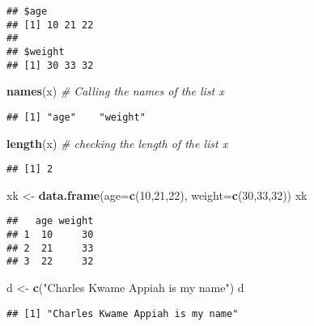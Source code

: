 \documentclass[
]{article}
\newenvironment{Shaded}{\begin{snugshade}}{\end{snugshade}}
\newcommand{\AttributeTok}[1]{\textcolor[rgb]{0.13,0.29,0.53}{#1}}
\newcommand{\CommentTok}[1]{\textcolor[rgb]{0.56,0.35,0.01}{\textit{#1}}}
\newcommand{\DecValTok}[1]{\textcolor[rgb]{0.00,0.00,0.81}{#1}}
\newcommand{\FunctionTok}[1]{\textcolor[rgb]{0.13,0.29,0.53}{\textbf{#1}}}
\newcommand{\NormalTok}[1]{#1}
\newcommand{\OtherTok}[1]{\textcolor[rgb]{0.56,0.35,0.01}{#1}}
\newcommand{\StringTok}[1]{\textcolor[rgb]{0.31,0.60,0.02}{#1}}
\begin{document}
\begin{verbatim}
## $age
## [1] 10 21 22
## 
## $weight
## [1] 30 33 32
\end{verbatim}

\begin{Shaded}
\begin{Highlighting}[]
\FunctionTok{names}\NormalTok{(x) }\CommentTok{\# Calling the names of the list x}
\end{Highlighting}
\end{Shaded}

\begin{verbatim}
## [1] "age"    "weight"
\end{verbatim}

\begin{Shaded}
\begin{Highlighting}[]
\FunctionTok{length}\NormalTok{(x) }\CommentTok{\# checking the length of the list x}
\end{Highlighting}
\end{Shaded}

\begin{verbatim}
## [1] 2
\end{verbatim}

\begin{Shaded}
\begin{Highlighting}[]
\NormalTok{xk }\OtherTok{\textless{}{-}} \FunctionTok{data.frame}\NormalTok{(}\AttributeTok{age=}\FunctionTok{c}\NormalTok{(}\DecValTok{10}\NormalTok{,}\DecValTok{21}\NormalTok{,}\DecValTok{22}\NormalTok{), }\AttributeTok{weight=}\FunctionTok{c}\NormalTok{(}\DecValTok{30}\NormalTok{,}\DecValTok{33}\NormalTok{,}\DecValTok{32}\NormalTok{))}
\NormalTok{xk}
\end{Highlighting}
\end{Shaded}

\begin{verbatim}
##   age weight
## 1  10     30
## 2  21     33
## 3  22     32
\end{verbatim}

\begin{Shaded}
\begin{Highlighting}[]
\NormalTok{d }\OtherTok{\textless{}{-}} \FunctionTok{c}\NormalTok{(}\StringTok{"Charles Kwame Appiah is my name"}\NormalTok{)}
\NormalTok{d}
\end{Highlighting}
\end{Shaded}

\begin{verbatim}
## [1] "Charles Kwame Appiah is my name"
\end{verbatim}
\end{document}
